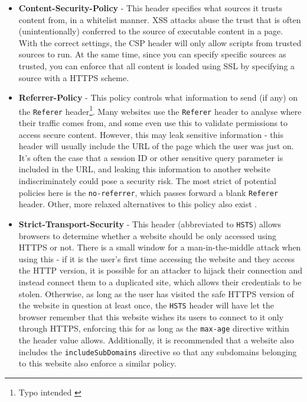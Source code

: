 \begin{itemize}
	\item \textbf{Content-Security-Policy} - This header specifies what sources it trusts content from, in a whitelist manner. XSS attacks abuse the trust that is often (unintentionally) conferred to the source of executable content in a page. With the correct settings, the CSP header will only allow scripts from trusted sources to run. At the same time, since you can specify specific sources as trusted, you can enforce that all content is loaded using SSL by specifying a source with a HTTPS scheme.
	
	\item \textbf{Referrer-Policy} - This policy controls what information to send (if any) on the \texttt{Referer} header\footnote{ Typo intended \cite{refererHeader}}. Many websites use the \texttt{Referer} header to analyse where their traffic comes from, and some even use this to validate permissions to access secure content. However, this may leak sensitive information - this header will usually include the URL of the page which the user was just on. It's often the case that a session ID or other sensitive query parameter is included in the URL, and leaking this information to another website indiscriminately could pose a security risk. The most strict of potential policies here is the \texttt{no-referrer}, which passes forward a blank \texttt{Referer} header. Other, more relaxed alternatives to this policy also exist \cite{referrerPolicy}.
	
	\item \textbf{Strict-Transport-Security} - 	This header (abbreviated to \texttt{HSTS}) allows browsers to determine whether a website should be only accessed using HTTPS or not. There is a small window for a man-in-the-middle attack when using this - if it is the user's first time accessing the website and they access the HTTP version, it is possible for an attacker to hijack their connection and instead connect them to a duplicated site, which allows their credentials to be stolen. Otherwise, as long as the user has visited the safe HTTPS version of the website in question at least once, the \texttt{HSTS} header will have let the browser remember that this website wishes its users to connect to it only through HTTPS, enforcing this for as long as the \texttt{max-age} directive within the header value allows. Additionally, it is recommended that a website also includes the \texttt{includeSubDomains} directive so that any subdomains belonging to this website also enforce a similar policy.
	

\end{itemize}

